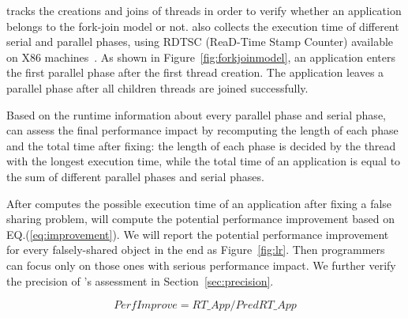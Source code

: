 \cheetah{} tracks the creations and joins of threads in order to verify whether an application belongs to the fork-join model or not. \Cheetah{} also collects the execution time of different serial and parallel phases, using RDTSC (ReaD-Time Stamp Counter) available on X86 machines~\cite{rtdsc}. As shown in Figure~\ref{fig:forkjoinmodel}, an application enters the first parallel phase after the first thread creation. The application leaves a parallel phase after all children threads are joined successfully. 

Based on the runtime information about every parallel phase and serial phase, \cheetah{} can assess the final performance impact by recomputing the length of each phase and the total time after fixing: the length of each phase is decided by the thread with the longest execution time, while the total time of an application is equal to the sum of different parallel phases and serial phases. 

After \cheetah{} computes the possible execution time of an application after fixing a false sharing problem, \cheetah{} will compute the potential performance improvement based on EQ.(\ref{eq:improvement}). We will report the potential performance improvement for every falsely-shared object in the end as Figure~\ref{fig:lr}. Then programmers can focus only on those ones with serious performance impact. We further verify the precision of \cheetah{}'s assessment in Section~\ref{sec:precision}.

\begin{equation}
\label{eq:improvement}
PerfImprove = RT\_{App} / PredRT\_{App}
\end{equation}










